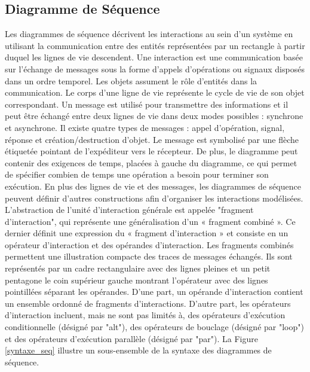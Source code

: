 \documentclass[french]{spimufcphdthesis}
\begin{document}
\subsection{Diagramme de Séquence}
Les diagrammes de séquence décrivent les interactions au sein d'un système en utilisant la communication entre des entités représentées par un rectangle à partir duquel les lignes de vie descendent. Une interaction est une communication basée sur l'échange de messages sous la forme d'appels d'opérations ou signaux disposés dans un ordre temporel. Les objets assument le rôle d’entités dans la communication. Le corps d'une ligne de vie représente le cycle de vie de son objet correspondant.
Un message est utilisé pour transmettre des informations et il peut être échangé entre deux lignes de vie dans deux modes possibles : synchrone et asynchrone. Il existe quatre types de messages : appel d'opération, signal, réponse et création/destruction d'objet. Le message est symbolisé par une flèche étiquetée pointant de l'expéditeur vers le récepteur. De plus, le diagramme peut contenir des exigences de temps, placées à gauche du diagramme, ce qui permet de spécifier combien de temps une opération a besoin pour terminer son exécution.
En plus des lignes de vie et des messages, les diagrammes de séquence peuvent définir d'autres constructions afin d'organiser les interactions modélisées. L'abstraction de l’unité d'interaction générale est appelée "fragment d'interaction", qui représente une généralisation d'un « fragment combiné ». Ce dernier définit une expression du « fragment d’interaction » et consiste en un opérateur d'interaction et des opérandes d'interaction. Les fragments combinés permettent une illustration compacte des traces de messages échangés.
Ils sont représentés par un cadre rectangulaire avec des lignes pleines et un petit pentagone le coin supérieur gauche montrant l'opérateur avec des lignes pointillées séparant les opérandes. D'une part, un opérande d'interaction contient un ensemble ordonné de fragments d'interactions. D'autre part, les opérateurs d'interaction incluent, mais ne sont pas limités à, des opérateurs d'exécution conditionnelle (désigné par "alt"), des opérateurs de bouclage (désigné par "loop") et des opérateurs d'exécution parallèle (désigné par "par"). La Figure \ref{syntaxe_seq} illustre un sous-ensemble de la syntaxe des diagrammes de séquence. 
\end{document}
